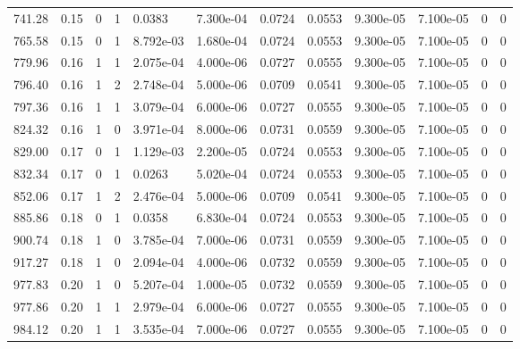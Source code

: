\documentclass[preview]{standalone}
\begin{document}
{{\begin{tabular}{L{1.2cm}C{1.2cm} C{0.3cm}C{0.5cm} C{1.4cm}C{1.4cm} C{1.4cm}C{1.4cm} C{1.6cm}C{1.6cm} C{1.6cm}C{1.6cm}}
  741.28  &  0.15  & 0     &  1 &  0.0383  & 7.300e-04  &  0.0724&   0.0553& 9.300e-05 & 7.100e-05   &  0 & 0  \\ 
  765.58  &  0.15  & 0     &  1 &  8.792e-03  & 1.680e-04  &  0.0724&   0.0553& 9.300e-05 & 7.100e-05   &  0 & 0  \\ 
  779.96  &  0.16  & 1     &  1 &  2.075e-04  & 4.000e-06  &  0.0727&   0.0555& 9.300e-05 & 7.100e-05   &  0 & 0  \\ 
  796.40  &  0.16  & 1     &  2 &  2.748e-04  & 5.000e-06  &  0.0709&   0.0541& 9.300e-05 & 7.100e-05   &  0 & 0  \\ 
  797.36  &  0.16  & 1     &  1 &  3.079e-04  & 6.000e-06  &  0.0727&   0.0555& 9.300e-05 & 7.100e-05   &  0 & 0  \\ 
  824.32  &  0.16  & 1     &  0 &  3.971e-04  & 8.000e-06  &  0.0731&   0.0559& 9.300e-05 & 7.100e-05   &  0 & 0  \\ 
  829.00  &  0.17  & 0     &  1 &  1.129e-03  & 2.200e-05  &  0.0724&   0.0553& 9.300e-05 & 7.100e-05   &  0 & 0  \\ 
  832.34  &  0.17  & 0     &  1 &  0.0263  & 5.020e-04  &  0.0724&   0.0553& 9.300e-05 & 7.100e-05   &  0 & 0  \\ 
  852.06  &  0.17  & 1     &  2 &  2.476e-04  & 5.000e-06  &  0.0709&   0.0541& 9.300e-05 & 7.100e-05   &  0 & 0  \\ 
  885.86  &  0.18  & 0     &  1 &  0.0358  & 6.830e-04  &  0.0724&   0.0553& 9.300e-05 & 7.100e-05   &  0 & 0  \\ 
  900.74  &  0.18  & 1     &  0 &  3.785e-04  & 7.000e-06  &  0.0731&   0.0559& 9.300e-05 & 7.100e-05   &  0 & 0  \\ 
  917.27  &  0.18  & 1     &  0 &  2.094e-04  & 4.000e-06  &  0.0732&   0.0559& 9.300e-05 & 7.100e-05   &  0 & 0  \\ 
  977.83  &  0.20  & 1     &  0 &  5.207e-04  & 1.000e-05  &  0.0732&   0.0559& 9.300e-05 & 7.100e-05   &  0 & 0  \\ 
  977.86  &  0.20  & 1     &  1 &  2.979e-04  & 6.000e-06  &  0.0727&   0.0555& 9.300e-05 & 7.100e-05   &  0 & 0  \\ 
  984.12  &  0.20  & 1     &  1 &  3.535e-04  & 7.000e-06  &  0.0727&   0.0555& 9.300e-05 & 7.100e-05   &  0 & 0  \\ 
\hline 
\end{tabular} 

}}
\end{document}
